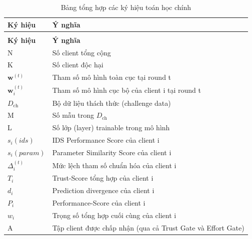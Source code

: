 \begin{longtable}[]{@{}
  >{\raggedright\arraybackslash}p{}
  >{\raggedright\arraybackslash}p{}@{}}
\caption{Bảng tổng hợp các ký hiệu toán học chính} \\
\toprule\noalign{}
\begin{minipage}[b]{\linewidth}\centering
\textbf{Ký hiệu}
\end{minipage} & \begin{minipage}[b]{\linewidth}\centering
\textbf{Ý nghĩa}
\end{minipage} \\
\midrule\noalign{}
\endfirsthead
%
\multicolumn{2}{c}{{\textit{(tiếp) Bảng 4.1}}} \\
\toprule\noalign{}
\begin{minipage}[b]{\linewidth}\centering
\textbf{Ký hiệu}
\end{minipage} & \begin{minipage}[b]{\linewidth}\centering
\textbf{Ý nghĩa}
\end{minipage} \\
\midrule\noalign{}
\endhead
\bottomrule\noalign{}
\endlastfoot
N & Số client tổng cộng \\
K & Số client độc hại \\
$\mathbf{w}^{(t)}$ & Tham số mô hình toàn cục tại round t \\
$\mathbf{w}_{i}^{(t)}$ & Tham số mô hình cục bộ của client i tại round t \\
$D_{\text{ch}}$ & Bộ dữ liệu thách thức (challenge data) \\
M & Số mẫu trong $D_{\text{ch}}$ \\
L & Số lớp (layer) trainable trong mô hình \\
$s_{i}(ids)$ & IDS Performance Score của client i \\
$s_{i}(param)$ & Parameter Similarity Score của client i \\
$\Delta_{i}^{(t)}$ & Mức lệch tham số chuẩn hóa của client i \\
$T_{i}$ & Trust-Score tổng hợp của client i \\
$d_{i}$ & Prediction divergence của client i \\
$P_{i}$ & Performance-Score của client i \\
$w_{i}$ & Trọng số tổng hợp cuối cùng của client i \\
A & Tập client được chấp nhận (qua cả Trust Gate và Effort Gate) \\
\end{longtable}

